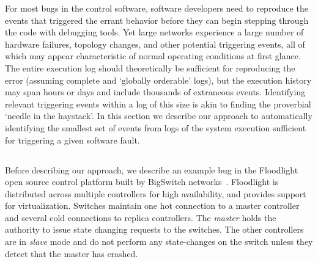 For most bugs in the control software, software
developers need to reproduce the events that triggered the errant
behavior before they can begin stepping through the code with
debugging tools. Yet large networks experience a large number of hardware failures, topology changes,
and other potential triggering events,
all of which may appear characteristic of normal operating
conditions at first glance. The entire
execution log should theoretically be sufficient for reproducing the error (assuming
complete and `globally orderable' logs), but the execution history may span
hours or days and include thousands of extraneous events.
Identifying relevant triggering events within a log of this size is akin to finding
the proverbial `needle in the haystack'.
In this section we describe our approach to automatically identifying
the smallest set of events from logs of the system execution sufficient for
triggering a given software fault.


\subsection{\SIMULATOR{}}
\label{sec:causal_analysis}


Before describing our approach, we describe an example bug in the Floodlight open source control platform
built by BigSwitch networks~\cite{bigswitch}. Floodlight is distributed across multiple
controllers for high availability, and provides support for virtualization.
Switches maintain one hot connection to a master
controller and several cold connections to replica controllers.
The \emph{master} holds the authority to issue state changing requests to the switches.
The other controllers are in \emph{slave} mode and do not perform any
state-changes on the switch unless they detect that the master has crashed.

